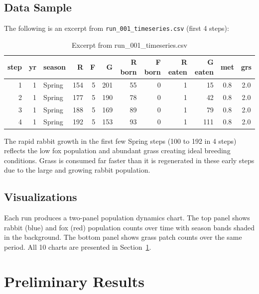 \documentclass[12pt]{article}
\begin{document}
\subsection{Data Sample}

The following is an excerpt from \texttt{run\_001\_timeseries.csv} (first 4
steps):

\begin{table}[H]
\centering
\caption{Excerpt from run\_001\_timeseries.csv}
\small
\begin{tabular}{rrlrrrrrrrcc}
\toprule
\textbf{step} & \textbf{yr} & \textbf{season} & \textbf{R} & \textbf{F} &
\textbf{G} & \textbf{R born} & \textbf{F born} & \textbf{R eaten} &
\textbf{G eaten} & \textbf{met} & \textbf{grs} \\
\midrule
1 & 1 & Spring & 154 & 5 & 201 & 55 & 0 & 1 & 15  & 0.8 & 2.0 \\
2 & 1 & Spring & 177 & 5 & 190 & 78 & 0 & 1 & 42  & 0.8 & 2.0 \\
3 & 1 & Spring & 188 & 5 & 169 & 89 & 0 & 1 & 79  & 0.8 & 2.0 \\
4 & 1 & Spring & 192 & 5 & 153 & 93 & 0 & 1 & 111 & 0.8 & 2.0 \\
\bottomrule
\end{tabular}
\end{table}

The rapid rabbit growth in the first few Spring steps (100 to 192 in 4 steps)
reflects the low fox population and abundant grass creating ideal breeding
conditions. Grass is consumed far faster than it is regenerated in these early
steps due to the large and growing rabbit population.

\subsection{Visualizations}

Each run produces a two-panel population dynamics chart. The top panel shows
rabbit (blue) and fox (red) population counts over time with season bands
shaded in the background. The bottom panel shows grass patch counts over the
same period. All 10 charts are presented in Section~\ref{sec:results}.

\section{Preliminary Results}
\label{sec:results}
\end{document}
